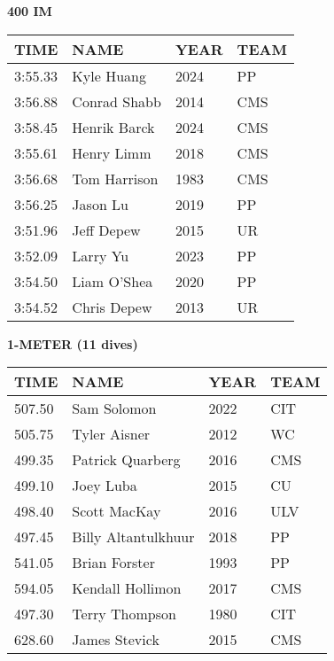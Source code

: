 \begin{table}[H]
\centering
\begin{minipage}[t]{0.6\textwidth}
\centering
\textbf{400 IM}\\[0.1cm]
\begin{tabular}{@{}p{1.8cm}p{2.8cm}p{1.2cm}p{1.4cm}@{}}
\hline
    \textbf{TIME} & \textbf{NAME} & \textbf{YEAR} & \textbf{TEAM} \\
\hline
    3:55.33 & Kyle Huang & 2024 & PP \\
    3:56.88 & Conrad Shabb & 2014 & CMS \\
    3:58.45 & Henrik Barck & 2024 & CMS \\
    3:55.61 & Henry Limm & 2018 & CMS \\
    3:56.68 & Tom Harrison & 1983 & CMS \\
    3:56.25 & Jason Lu & 2019 & PP \\
    3:51.96 & Jeff Depew & 2015 & UR \\
    3:52.09 & Larry Yu & 2023 & PP \\
    3:54.50 & Liam O'Shea & 2020 & PP \\
    3:54.52 & Chris Depew & 2013 & UR \\
\hline
\end{tabular}
\end{minipage}
\end{table}

\begin{table}[H]
\centering
\begin{minipage}[t]{0.6\textwidth}
\centering
\textbf{1-METER (11 dives)}\\[0.1cm]
\begin{tabular}{@{}p{1.8cm}p{2.8cm}p{1.2cm}p{1.4cm}@{}}
\hline
    \textbf{TIME} & \textbf{NAME} & \textbf{YEAR} & \textbf{TEAM} \\
\hline
    507.50 & Sam Solomon & 2022 & CIT \\
    505.75 & Tyler Aisner & 2012 & WC \\
    499.35 & Patrick Quarberg & 2016 & CMS \\
    499.10 & Joey Luba & 2015 & CU \\
    498.40 & Scott MacKay & 2016 & ULV \\
    497.45 & Billy Altantulkhuur & 2018 & PP \\
    541.05 & Brian Forster & 1993 & PP \\
    594.05 & Kendall Hollimon & 2017 & CMS \\
    497.30 & Terry Thompson & 1980 & CIT \\
    628.60 & James Stevick & 2015 & CMS \\
\hline
\end{tabular}
\end{minipage}
\end{table}

